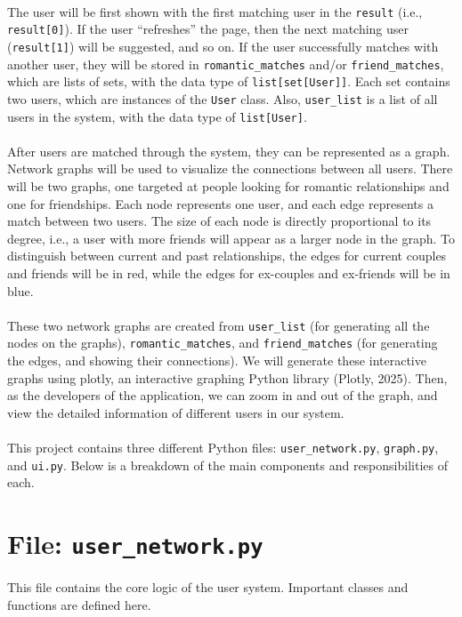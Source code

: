 \documentclass[fontsize=11pt]{article}
\begin{document}
\\
The user will be first shown with the first matching user in the \texttt{result}  (i.e., \texttt{result[0]}).
If the user “refreshes” the page, then the next matching user (\texttt{result[1]}) will be suggested, and so on.
If the user successfully matches with another user, they will be stored in \texttt{romantic\_matches} and/or \texttt{friend\_matches},
which are lists of sets, with the data type of \texttt{list[set[User]]}.
Each set contains two users, which are instances of the \texttt{User} class.
Also, \texttt{user\_list} is a list of all users in the system, with the data type of \texttt{list[User]}.
\\
\\
After users are matched through the system, they can be represented as a graph.
Network graphs will be used to visualize the connections between all users.
There will be two graphs, one targeted at people looking for romantic relationships and one for friendships.
Each node represents one user, and each edge represents a match between two users.
The size of each node is directly proportional to its degree, i.e., a user with more friends will appear as a larger node in the graph.
To distinguish between current and past relationships, the edges for current couples and friends will be in red, while the edges for ex-couples and ex-friends will be in blue.
\\
\\
These two network graphs are created from \texttt{user\_list} (for generating all the nodes on the graphs),
\texttt{romantic\_matches}, and \texttt{friend\_matches} (for generating the edges, and showing their connections).
We will generate these interactive graphs using plotly, an interactive graphing Python library (Plotly, 2025).
Then, as the developers of the application, we can zoom in and out of the graph, and view the detailed information of different users in our system.
\\
\\
This project contains three different Python files: \texttt{user\_network.py}, \texttt{graph.py}, and \texttt{ui.py}. Below is a breakdown of the main components and responsibilities of each.

\section*{File: \texttt{user\_network.py}}

This file contains the core logic of the user system. Important classes and functions are defined here.
\end{document}
